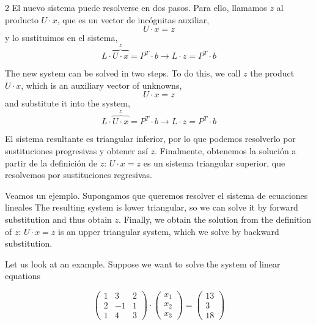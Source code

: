 \begin{paracol}{2}
\switchcolumn
El nuevo sistema puede resolverse en dos pasos. Para ello, llamamos $z$ al producto $U\cdot x$, que es un vector de incógnitas auxiliar,
\begin{equation*}
U\cdot x=z
\end{equation*}
y lo sustituimos en el sistema,
\begin{equation*}
L\cdot \overbrace{U\cdot x}^z=P^T\cdot b \rightarrow L\cdot z=P^T\cdot b
\end{equation*}

\switchcolumn
The new system can be solved in two steps. To do this, we call $z$ the product $U\cdot x$, which is an auxiliary vector of unknowns,
\begin{equation*}
U\cdot x=z
\end{equation*}
and substitute it into the system,
\begin{equation*}
L\cdot \overbrace{U\cdot x}^z=P^T\cdot b \rightarrow L\cdot z=P^T\cdot b
\end{equation*}

\switchcolumn
El sistema resultante es triangular inferior, por lo que podemos resolverlo por sustituciones progresivas y obtener así $z$. Finalmente, obtenemos la solución a partir de la definición de $z$: $U \cdot x =z$ es un sistema triangular superior, que resolvemos por sustituciones regresivas.

Veamos un ejemplo. Supongamos que queremos resolver el sistema de ecuaciones lineales
\switchcolumn
The resulting system is lower triangular, so we can solve it by forward substitution and thus obtain $z$. Finally, we obtain the solution from the definition of $z$: $U \cdot x =z$ is an upper triangular system, which we solve by backward substitution.

Let us look at an example. Suppose we want to solve the system of linear equations
\end{paracol}

\begin{equation*}
\begin{pmatrix}
1& 3& 2\\
2& -1& 1\\
1& 4& 3
\end{pmatrix}\cdot \begin{pmatrix}
x_1\\
x_2\\
x_3
\end{pmatrix}=\begin{pmatrix}
13\\
3\\
18
\end{pmatrix}
\end{equation*}

